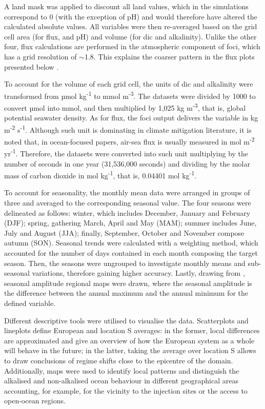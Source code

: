 A land mask was applied to discount all land values, which in the simulations correspond to 0 (with the exception of pH) and would therefore have altered the calculated absolute values. All variables were then re-averaged based on the grid cell area (for  flux,  and pH) and volume (for \ac{dic} and alkalinity). Unlike the other four,  flux calculations are performed in the atmospheric component of \ac{foci}, which has a grid resolution of $\sim$1.8\textdegree{}. This explains the coarser pattern in the  flux plots presented below \citep{matthes2020flexible}.

To account for the volume of each grid cell, the units of \ac{dic} and alkalinity were transformed from µmol kg\textsuperscript{-1} to mmol m\textsuperscript{-3}. The datasets were divided by 1000 to convert µmol into mmol, and then multiplied by 1,025 kg m\textsuperscript{-3}, that is, global potential seawater density. As for  flux, the \ac{foci} output delivers the variable in kg m\textsuperscript{-2} s\textsuperscript{-1}. Although such unit is dominating in climate mitigation literature, it is noted that, in ocean-focused papers, air-sea  flux is usually measured in mol m\textsuperscript{-2} yr\textsuperscript{-1}. Therefore, the datasets were converted into such unit multiplying by the number of seconds in one year (31,536,000 seconds) and dividing by the molar mass of carbon dioxide in mol kg\textsuperscript{-1}, that is, 0.04401 mol kg\textsuperscript{-1}.

To account for seasonality, the monthly mean data were arranged in groups of three and averaged to the corresponding seasonal value. The four seasons were delineated as follows: winter, which includes December, January and February (DJF); spring, gathering March, April and May (MAM); summer includes June, July and August (JJA); finally, September, October and November compose autumn (SON). Seasonal trends were calculated with a weighting method, which accounted for the number of days contained in each month composing the target season. Then, the seasons were ungrouped to investigate monthly means and sub-seasonal variations, therefore gaining higher accuracy. Lastly, drawing from \cite{jo2022future}, seasonal amplitude regional maps were drawn, where the seasonal amplitude is the difference between the annual maximum and the annual minimum for the defined variable. 

Different descriptive tools were utilised to visualise the data. Scatterplots and lineplots define European and location S averages: in the former, local differences are approximated and give an overview of how the European system as a whole will behave in the future; in the latter, taking the average over location S allows to draw conclusions of regime shifts close to the epicentre of the domain. Additionally, maps were used to identify local patterns and distinguish the alkalised and non-alkalised ocean behaviour in different geographical areas accounting, for example, for the vicinity to the injection sites or the access to open-ocean regions.

